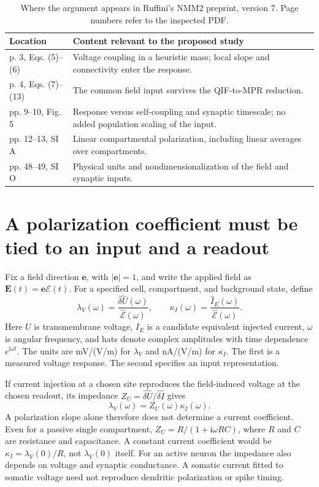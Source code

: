 \documentclass[11pt,a4paper]{article}
\newcommand{\ii}{\mathrm i}
\newcommand{\E}{\mathcal E}
\begin{document}
\begin{table}[ht]
\centering\small
\caption{Where the argument appears in Ruffini's NMM2 preprint, version 7. Page numbers refer to the inspected PDF.}\label{tab:prior}
\begin{tabularx}{\linewidth}{@{}p{31mm}X@{}}
\toprule
Location & Content relevant to the proposed study\\\midrule
p. 3, Eqs. (5)--(6) & Voltage coupling in a heuristic mass; local slope and connectivity enter the response.\\
p. 4, Eqs. (7)--(13) & The common field input survives the QIF-to-MPR reduction.\\
pp. 9--10, Fig. 5 & Response versus self-coupling and synaptic timescale; no added population scaling of the input.\\
pp. 12--13, SI A & Linear compartmental polarization, including linear averages over compartments.\\
pp. 48--49, SI O & Physical units and nondimensionalization of the field and synaptic inputs.\\\bottomrule
\end{tabularx}
\end{table}
\FloatBarrier

\section{A polarization coefficient must be tied to an input and a readout}

Fix a field direction $\mathbf e$, with $|\mathbf e|=1$, and write the applied field as $\mathbf E(t)=\mathbf e\E(t)$. For a specified cell, compartment, and background state, define
\begin{equation}
\lambda_V(\omega)=\frac{\widehat{\delta U}(\omega)}{\widehat{\E}(\omega)},
\qquad
\kappa_I(\omega)=\frac{\widehat{I}_{E}(\omega)}{\widehat{\E}(\omega)}.
\label{eq:definitions}
\end{equation}
Here $U$ is transmembrane voltage, $I_E$ is a candidate equivalent injected current, $\omega$ is angular frequency, and hats denote complex amplitudes with time dependence $e^{\ii\omega t}$. The units are mV/(V/m) for $\lambda_V$ and nA/(V/m) for $\kappa_I$. The first is a measured voltage response. The second specifies an input representation.

If current injection at a chosen site reproduces the field-induced voltage at the chosen readout, its impedance $Z_U=\widehat{\delta U}/\widehat{\delta I}$ gives
\begin{equation}
\lambda_V(\omega)=Z_U(\omega)\kappa_I(\omega).
\label{eq:impedance}
\end{equation}
A polarization slope alone therefore does not determine a current coefficient. Even for a passive single compartment, $Z_U=R/(1+\ii\omega RC)$, where $R$ and $C$ are resistance and capacitance. A constant current coefficient would be $\kappa_I=\lambda_V(0)/R$, not $\lambda_V(0)$ itself. For an active neuron the impedance also depends on voltage and synaptic conductance. A somatic current fitted to somatic voltage need not reproduce dendritic polarization or spike timing.
\end{document}
